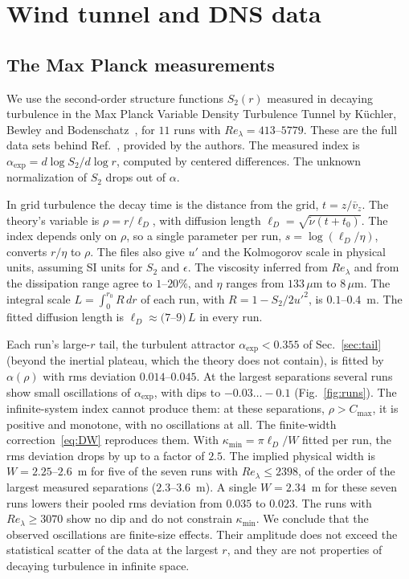 \documentclass[aip,pof,preprint,floatfix,nofootinbib,amsmath,amssymb]{revtex4-2}
\begin{document}
\section{Wind tunnel and DNS data}\label{sec:data}

\subsection{The Max Planck measurements}

We use the second-order structure functions $S_2(r)$ measured in decaying turbulence in the Max Planck Variable Density
Turbulence Tunnel by Küchler, Bewley and Bodenschatz~\cite{GregXi2}, for $11$ runs with $Re_\lambda=413$--$5779$. These are the
full data sets behind Ref.~, provided by the authors. The measured index is
$\alpha_{\exp}=d\log S_2/d\log r$, computed by centered differences. The unknown normalization of $S_2$ drops out of $\alpha$.

In grid turbulence the decay time is the distance from the grid, $t=z/\bar v_z$. The theory's variable is
$\rho=r/\ell_D$, with diffusion length $\ell_D=\sqrt{\tilde\nu(t+t_0)}$. The index depends only on $\rho$, so a single parameter per run, $s=\log(\ell_D/\eta)$, converts $r/\eta$ to $\rho$.
The files also give $u'$ and the Kolmogorov scale in physical units, assuming SI units for $S_2$ and $\epsilon$. The
viscosity inferred from $Re_\lambda$ and from the dissipation range agree to $1$--$20\%$, and $\eta$ ranges from $133\,\mu$m to
$8\,\mu$m. The integral scale $L=\int_0^{r_0}R\,dr$ of each run, with $R=1-S_2/2u'^2$, is $0.1$--$0.4$~m. The fitted diffusion
length is $\ell_D\approx(7$--$9)\,L$ in every run.

Each run's large-$r$ tail, the turbulent attractor $\alpha_{\exp}<0.355$ of Sec.~\ref{sec:tail} (beyond the inertial plateau, which the theory does not contain), is fitted by
$\alpha(\rho)$ with rms deviation $0.014$--$0.045$. At the largest separations several runs show small oscillations of
$\alpha_{\exp}$, with dips to $-0.03\ldots-0.1$ (Fig.~\ref{fig:runs}). The infinite-system index cannot produce them: at these
separations, $\rho>C_{\max}$, it is positive and monotone, with no oscillations at all. The finite-width correction~\eqref{eq:DW}
reproduces them. With $\kappa_{\min}=\pi\ell_D/W$ fitted per run, the rms deviation drops by up to a factor of $2.5$. The
implied physical width is $W=2.25$--$2.6$~m for five of the seven runs with $Re_\lambda\le2398$, of the order of the largest
measured separations ($2.3$--$3.6$~m). A single $W=2.34$~m for these seven runs lowers their pooled rms deviation from $0.035$
to $0.023$. The runs with $Re_\lambda\ge3070$ show no dip and do not
constrain $\kappa_{\min}$. We conclude that the observed oscillations are finite-size effects. Their amplitude does not exceed the statistical scatter of
the data at the largest $r$, and they are not properties of decaying turbulence in infinite space.
\end{document}
